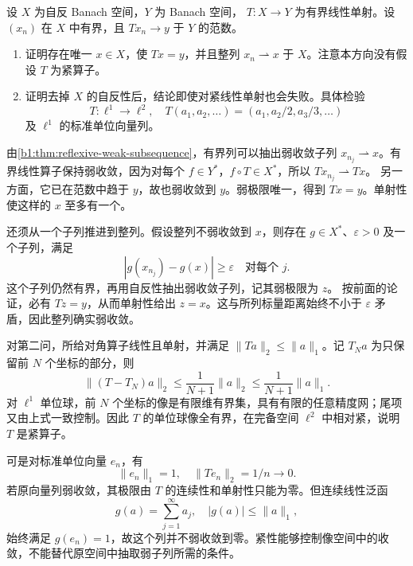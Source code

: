 \begin{optionalexercise}\label{b1:ex:25-recover-weak-limit}
设 \(X\) 为自反 Banach 空间，\(Y\) 为 Banach 空间，
\(T:X\to Y\) 为有界线性单射。设 \((x_n)\) 在 \(X\) 中有界，且
\(Tx_n\to y\) 于 \(Y\) 的范数。
\begin{enumerate}
 \item\label{b1:item:25-reflexive-recovery}
 证明存在唯一 \(x\in X\)，使 \(Tx=y\)，并且整列
 \(x_n\rightharpoonup x\) 于 \(X\)。注意本方向没有假设 \(T\) 为紧算子。
 \item\label{b1:item:25-nonreflexive-recovery-failure}
 证明去掉 \(X\) 的自反性后，结论即使对紧线性单射也会失败。具体检验
 \[
  T:\ell^1\longrightarrow\ell^2,\quad
  T(a_1,a_2,\ldots)=(a_1,a_2/2,a_3/3,\ldots)
 \]
 及 \(\ell^1\) 的标准单位向量列。
\end{enumerate}
\end{optionalexercise}
\begin{solution}
由\cref{b1:thm:reflexive-weak-subsequence}，有界列可以抽出弱收敛子列
\(x_{n_j}\rightharpoonup x\)。有界线性算子保持弱收敛，因为对每个
\(f\in Y^*\)，\(f\circ T\in X^*\)，所以 \(Tx_{n_j}\rightharpoonup Tx\)。
另一方面，它已在范数中趋于 \(y\)，故也弱收敛到 \(y\)。弱极限唯一，得到
\(Tx=y\)。单射性使这样的 \(x\) 至多有一个。

还须从一个子列推进到整列。假设整列不弱收敛到 \(x\)，则存在
\(g\in X^*\)、\(\varepsilon>0\) 及一个子列，满足
\[
 |g(x_{n_j})-g(x)|\ge\varepsilon\quad\text{对每个 }j.
\]
这个子列仍然有界，再用自反性抽出弱收敛子列，记其弱极限为 \(z\)。
按前面的论证，必有 \(Tz=y\)，从而单射性给出 \(z=x\)。这与所列标量距离始终不小于 \(\varepsilon\) 矛盾，因此整列确实弱收敛。

对第二问，所给对角算子线性且单射，并满足
\(\|Ta\|_2\le\|a\|_1\)。记 \(T_Na\) 为只保留前 \(N\) 个坐标的部分，则
\[
 \|(T-T_N)a\|_2
       \le\frac1{N+1}\|a\|_2
       \le\frac1{N+1}\|a\|_1.
\]
对 \(\ell^1\) 单位球，前 \(N\) 个坐标的像是有限维有界集，具有有限的任意精度网；尾项又由上式一致控制。因此 \(T\) 的单位球像全有界，在完备空间
\(\ell^2\) 中相对紧，说明 \(T\) 是紧算子。

可是对标准单位向量 \(e_n\)，有
\[
 \|e_n\|_1=1,\quad \|Te_n\|_2=1/n\longrightarrow0.
\]
若原向量列弱收敛，其极限由 \(T\) 的连续性和单射性只能为零。但连续线性泛函
\[
 g(a)=\sum_{j=1}^\infty a_j,\quad |g(a)|\le\|a\|_1,
\]
始终满足 \(g(e_n)=1\)，故这个列并不弱收敛到零。紧性能够控制像空间中的收敛，不能替代原空间中抽取弱子列所需的条件。
\end{solution}
